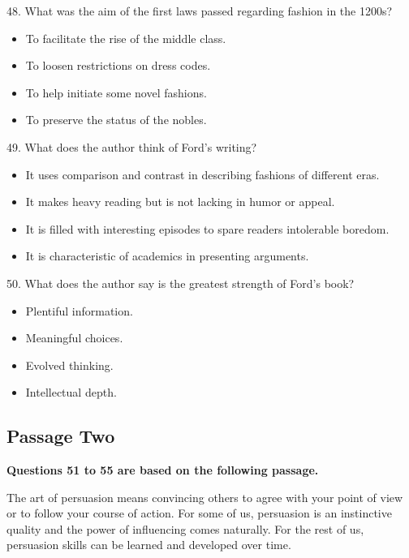 \documentclass[UTF8,11pt]{ctexart}
\begin{document}
48. What was the aim of the first laws passed regarding fashion in the 1200s?


\begin{itemize}[leftmargin=2em,itemsep=.2em,topsep=.4em]\item[A.] To facilitate the rise of the middle class.
\item[B.] To loosen restrictions on dress codes.
\item[C.] To help initiate some novel fashions.
\item[D.] To preserve the status of the nobles.
\end{itemize}

49. What does the author think of Ford’s writing?


\begin{itemize}[leftmargin=2em,itemsep=.2em,topsep=.4em]\item[A.] It uses comparison and contrast in describing fashions of different eras.
\item[B.] It makes heavy reading but is not lacking in humor or appeal.
\item[C.] It is filled with interesting episodes to spare readers intolerable boredom.
\item[D.] It is characteristic of academics in presenting arguments.
\end{itemize}

50. What does the author say is the greatest strength of Ford’s book?


\begin{itemize}[leftmargin=2em,itemsep=.2em,topsep=.4em]\item[A.] Plentiful information.
\item[B.] Meaningful choices.
\item[C.] Evolved thinking.
\item[D.] Intellectual depth.
\end{itemize}

\subsection*{\textbf{Passage Two}}


\textbf{Questions 51 to 55 are based on the following passage.}


The art of persuasion means convincing others to agree with your point of view or to follow your course of action. For some of us, persuasion is an instinctive quality and the power of influencing comes naturally. For the rest of us, persuasion skills can be learned and developed over time.
\end{document}
